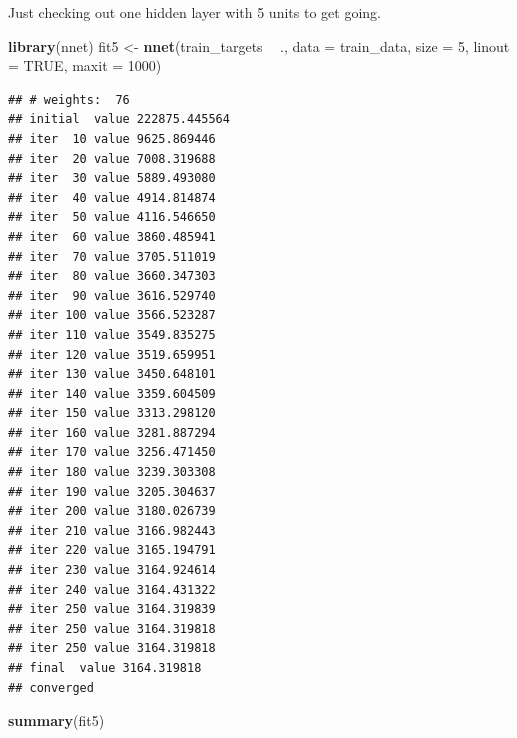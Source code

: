 \documentclass[10pt,ignorenonframetext,]{beamer}
\newenvironment{Shaded}{\begin{snugshade}}{\end{snugshade}}
\newcommand{\DataTypeTok}[1]{\textcolor[rgb]{0.13,0.29,0.53}{#1}}
\newcommand{\DecValTok}[1]{\textcolor[rgb]{0.00,0.00,0.81}{#1}}
\newcommand{\KeywordTok}[1]{\textcolor[rgb]{0.13,0.29,0.53}{\textbf{#1}}}
\newcommand{\NormalTok}[1]{#1}
\newcommand{\OperatorTok}[1]{\textcolor[rgb]{0.81,0.36,0.00}{\textbf{#1}}}
\newcommand{\OtherTok}[1]{\textcolor[rgb]{0.56,0.35,0.01}{#1}}
\newcommand{\StringTok}[1]{\textcolor[rgb]{0.31,0.60,0.02}{#1}}
\begin{document}
\begin{frame}[fragile]

Just checking out one hidden layer with 5 units to get going.

\scriptsize

\begin{Shaded}
\begin{Highlighting}[]
\KeywordTok{library}\NormalTok{(nnet)}
\NormalTok{fit5 <-}\StringTok{ }\KeywordTok{nnet}\NormalTok{(train_targets }\OperatorTok{~}\StringTok{ }\NormalTok{., }\DataTypeTok{data =}\NormalTok{ train_data, }\DataTypeTok{size =} \DecValTok{5}\NormalTok{, }\DataTypeTok{linout =} \OtherTok{TRUE}\NormalTok{, }
    \DataTypeTok{maxit =} \DecValTok{1000}\NormalTok{)}
\end{Highlighting}
\end{Shaded}

\begin{verbatim}
## # weights:  76
## initial  value 222875.445564 
## iter  10 value 9625.869446
## iter  20 value 7008.319688
## iter  30 value 5889.493080
## iter  40 value 4914.814874
## iter  50 value 4116.546650
## iter  60 value 3860.485941
## iter  70 value 3705.511019
## iter  80 value 3660.347303
## iter  90 value 3616.529740
## iter 100 value 3566.523287
## iter 110 value 3549.835275
## iter 120 value 3519.659951
## iter 130 value 3450.648101
## iter 140 value 3359.604509
## iter 150 value 3313.298120
## iter 160 value 3281.887294
## iter 170 value 3256.471450
## iter 180 value 3239.303308
## iter 190 value 3205.304637
## iter 200 value 3180.026739
## iter 210 value 3166.982443
## iter 220 value 3165.194791
## iter 230 value 3164.924614
## iter 240 value 3164.431322
## iter 250 value 3164.319839
## iter 250 value 3164.319818
## iter 250 value 3164.319818
## final  value 3164.319818 
## converged
\end{verbatim}

\begin{Shaded}
\begin{Highlighting}[]
\KeywordTok{summary}\NormalTok{(fit5)}
\end{Highlighting}
\end{Shaded}


\end{frame}
\end{document}
